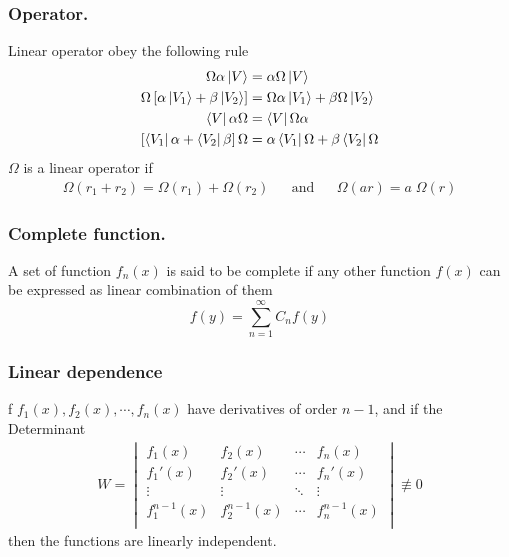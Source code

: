 \documentclass[../main.tex]{subfiles}
\begin{document}
\subsubsection*{Operator.}
Linear operator obey the following rule
\begin{align*}
	\Omega \alpha \ket{V}                               & =\alpha\Omega \ket{V}                         \\
	\Omega\left[\alpha \ket{V_1}+\beta \ket{V_2}\right] & =\Omega\alpha \ket{V_1}+\beta\Omega \ket{V_2} \\
	\bra{V}\alpha\Omega                                 & =\bra{V}\Omega\alpha                          \\
	\left[\bra{V_1}\alpha+\bra{V_2}\beta\right]\Omega   & =\alpha \bra{V_1}\Omega +\beta\bra{V_2}\Omega
\end{align*}
$\Omega$ is a linear operator if
\begin{align*}
	\Omega(r_1+r_2)= \Omega(r_1)+ \Omega(r_2) &  & \mathrm{and} &  & \Omega(ar)=a\;\Omega(r)
\end{align*}

\subsubsection*{Complete function.} A set of function $f_n(x)$ is said to be complete if any other function $f(x)$ can be expressed as linear combination of them
\begin{equation*}
	f(y)=\sum_{n=1}^{\infty} C_nf(y)
\end{equation*}
\subsubsection*{Linear dependence}f $f_1(x), f_2(x),\cdots, f_n(x)$ have derivatives of order $n - 1$, and if the Determinant
\begin{align*}
	W=\begin{vmatrix}
		  f_1(x)       & f_2(x)       & \cdots & f_n(x)       \\
		  f_1'(x)      & f_2'(x)      & \cdots & f_n'(x)      \\
		  \vdots       & \vdots       & \ddots & \vdots       \\
		  f_1^{n-1}(x) & f_2^{n-1}(x) & \cdots & f_n^{n-1}(x) \\
	  \end{vmatrix}\not\equiv0
\end{align*}then the functions are linearly independent.
\end{document}
